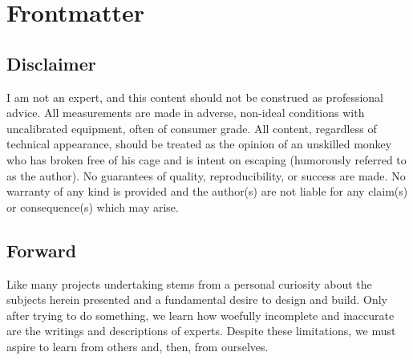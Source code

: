 \section*{Frontmatter}
%
\subsection{Disclaimer}
I am not an expert, and this content should not be construed as professional advice. All measurements are made in adverse, non-ideal conditions with uncalibrated equipment, often of consumer grade. All content, regardless of technical appearance, should be treated as the opinion of an unskilled monkey who has broken free of his cage and is intent on escaping (humorously referred to as the author). No guarantees of quality, reproducibility, or success are made. No warranty of any kind is provided and the author(s) are not liable for any claim(s) or consequence(s) which may arise.\par
%
\subsection{Forward}
Like many projects undertaking stems from a personal curiosity about the subjects herein presented and a fundamental desire to design and build. Only after trying to do something, we learn how woefully incomplete and inaccurate are the writings and descriptions of experts. Despite these limitations, we must aspire to learn from others and, then, from ourselves.\par

